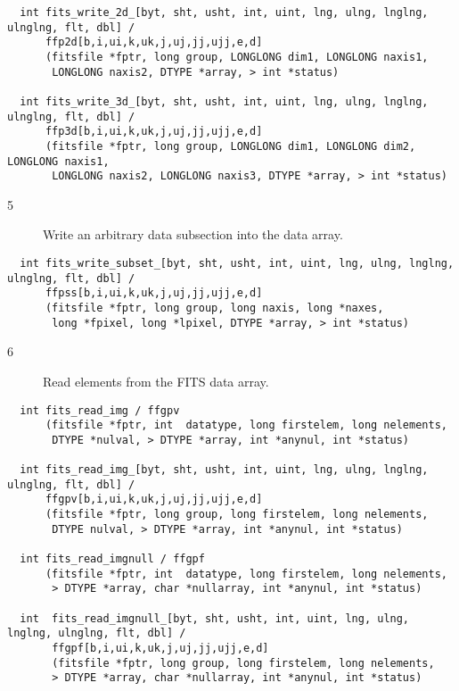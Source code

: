 \documentclass[11pt]{book}
\begin{document}
\begin{verbatim}
  int fits_write_2d_[byt, sht, usht, int, uint, lng, ulng, lnglng, ulnglng, flt, dbl] /
      ffp2d[b,i,ui,k,uk,j,uj,jj,ujj,e,d]
      (fitsfile *fptr, long group, LONGLONG dim1, LONGLONG naxis1,
       LONGLONG naxis2, DTYPE *array, > int *status)

  int fits_write_3d_[byt, sht, usht, int, uint, lng, ulng, lnglng, ulnglng, flt, dbl] /
      ffp3d[b,i,ui,k,uk,j,uj,jj,ujj,e,d]
      (fitsfile *fptr, long group, LONGLONG dim1, LONGLONG dim2, LONGLONG naxis1,
       LONGLONG naxis2, LONGLONG naxis3, DTYPE *array, > int *status)
\end{verbatim}

\begin{description}
\item[5 ]  Write an arbitrary data subsection into the data array. \label{ffpssx}
\end{description}

\begin{verbatim}
  int fits_write_subset_[byt, sht, usht, int, uint, lng, ulng, lnglng, ulnglng, flt, dbl] /
      ffpss[b,i,ui,k,uk,j,uj,jj,ujj,e,d]
      (fitsfile *fptr, long group, long naxis, long *naxes,
       long *fpixel, long *lpixel, DTYPE *array, > int *status)
\end{verbatim}

\begin{description}
\item[6 ] Read elements from the FITS data array.
    \label{ffgpv} \label{ffgpvx} \label{ffgpf} \label{ffgpfx}
\end{description}

\begin{verbatim}
  int fits_read_img / ffgpv
      (fitsfile *fptr, int  datatype, long firstelem, long nelements,
       DTYPE *nulval, > DTYPE *array, int *anynul, int *status)

  int fits_read_img_[byt, sht, usht, int, uint, lng, ulng, lnglng, ulnglng, flt, dbl] /
      ffgpv[b,i,ui,k,uk,j,uj,jj,ujj,e,d]
      (fitsfile *fptr, long group, long firstelem, long nelements,
       DTYPE nulval, > DTYPE *array, int *anynul, int *status)

  int fits_read_imgnull / ffgpf
      (fitsfile *fptr, int  datatype, long firstelem, long nelements,
       > DTYPE *array, char *nullarray, int *anynul, int *status)

  int  fits_read_imgnull_[byt, sht, usht, int, uint, lng, ulng, lnglng, ulnglng, flt, dbl] /
       ffgpf[b,i,ui,k,uk,j,uj,jj,ujj,e,d]
       (fitsfile *fptr, long group, long firstelem, long nelements,
       > DTYPE *array, char *nullarray, int *anynul, int *status)
\end{verbatim}
\end{document}
